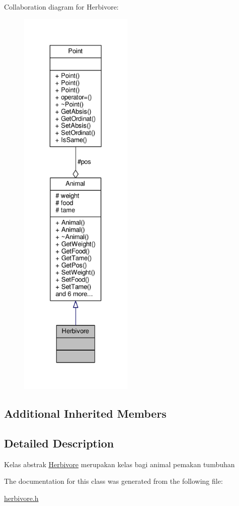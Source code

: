 Collaboration diagram for Herbivore\+:
\nopagebreak
\begin{figure}[H]
\begin{center}
\leavevmode
\includegraphics[height=550pt]{classHerbivore__coll__graph}
\end{center}
\end{figure}
\subsection*{Additional Inherited Members}


\subsection{Detailed Description}
Kelas abstrak \hyperlink{classHerbivore}{Herbivore} merupakan kelas bagi animal pemakan tumbuhan 

The documentation for this class was generated from the following file\+:\begin{DoxyCompactItemize}
\item 
\hyperlink{herbivore_8h}{herbivore.\+h}\end{DoxyCompactItemize}
